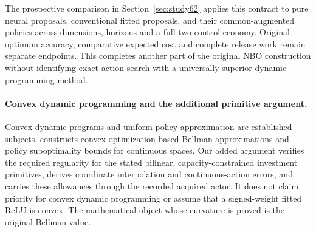 \documentclass[ecta,nameyear,draft]{econsocart}
\begin{document}
The prospective comparison in Section~\ref{sec:study62} applies this contract to pure neural proposals, conventional fitted proposals, and their common-augmented policies across dimensions, horizons and a full two-control economy. Original-optimum accuracy, comparative expected cost and complete release work remain separate endpoints. This completes another part of the original NBO construction without identifying exact action search with a universally superior dynamic-programming method.

\paragraph{Convex dynamic programming and the additional primitive argument.}
Convex dynamic programs and uniform policy approximation are established subjects. \citet{yang2020convex} constructs convex optimization-based Bellman approximations and policy suboptimality bounds for continuous spaces. Our added argument verifies the required regularity for the stated bilinear, capacity-constrained investment primitives, derives coordinate interpolation and continuous-action errors, and carries these allowances through the recorded acquired actor. It does not claim priority for convex dynamic programming or assume that a signed-weight fitted ReLU is convex. The mathematical object whose curvature is proved is the original Bellman value.






\end{document}
